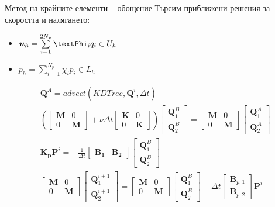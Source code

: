 \documentclass{beamer}
\newcommand{\vecf}[1]{\boldsymbol{#1}}
\begin{document}
    \begin{frame}{Метод на крайните елементи -- обощение}
        	Търсим приближени решения за скоростта и налягането:
    		\begin{itemize}
    			\item $\vecf{u}_h = \sum\limits_{i=1}^{2N_v}{\vecf{\textPhi}_iq_i} \in U_h$
    			\item $p_h = \sum\limits_{i=1}^{N_p}{\chi_ip_i} \in L_h$
		\end{itemize}
        	\begin{align*}
	&\vecf{Q}^A = advect(KDTree, \vecf{Q}^i, \Delta t)\\
		&\left(\begin{bmatrix}
		\mathbf{M} & 0 \\
		0 & \mathbf{M}
	\end{bmatrix} + \nu\Delta t\begin{bmatrix}
		\mathbf{K} & 0 \\
		0 & \mathbf{K}
	\end{bmatrix}\right)\begin{bmatrix}
		\vecf{Q}^{B}_1 \\
		\vecf{Q}^{B}_2
	\end{bmatrix} = \begin{bmatrix}
		\mathbf{M} & 0 \\
		0 & \mathbf{M}
	\end{bmatrix}\begin{bmatrix}
		\vecf{Q}^{A}_1 \\
		\vecf{Q}^{A}_2
	\end{bmatrix}\\
	&\mathbf{K_p}\vecf{P}^i = -\frac{1}{\Delta t} \begin{bmatrix}
		\mathbf{B_1} & \mathbf{B_2}
	\end{bmatrix} \begin{bmatrix}
		\vecf{Q}^{B}_1 \\
		\vecf{Q}^{B}_2
	\end{bmatrix}\\
	&\begin{bmatrix}
		\mathbf{M} & 0 \\
		0 & \mathbf{M}
	\end{bmatrix} \begin{bmatrix}
		\vecf{Q}^{i+1}_1 \\
		\vecf{Q}^{i+1}_2
	\end{bmatrix} =	\begin{bmatrix}
		\mathbf{M} & 0 \\
		0 & \mathbf{M}
	\end{bmatrix} \begin{bmatrix}
		\vecf{Q}^{B}_1 \\
		\vecf{Q}^{B}_2
	\end{bmatrix} - \Delta t \begin{bmatrix}
		\vecf{B}_{p,1} \\
		\vecf{B}_{p,2}
	\end{bmatrix} \vecf{P}^i
\end{align*}
    \end{frame}
    
\end{document}
